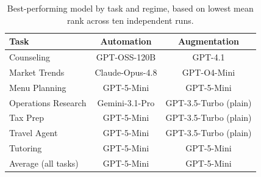 \begin{table}[t]
    \centering
    \caption{Best-performing model by task and regime, based on lowest mean rank across ten independent runs.}
    \label{tab:best-model-by-task}
    \small
    \begin{tabular}{lcc}
        \toprule
        Task & Automation & Augmentation \\
        \midrule
        Counseling & GPT-OSS-120B & GPT-4.1 \\
        Market Trends & Claude-Opus-4.8 & GPT-O4-Mini \\
        Menu Planning & GPT-5-Mini & GPT-5-Mini \\
        Operations Research & Gemini-3.1-Pro & GPT-3.5-Turbo (plain) \\
        Tax Prep & GPT-5-Mini & GPT-3.5-Turbo (plain) \\
        Travel Agent & GPT-5-Mini & GPT-3.5-Turbo (plain) \\
        Tutoring & GPT-5-Mini & GPT-5-Mini \\
        Average (all tasks) & GPT-5-Mini & GPT-5-Mini \\
        \bottomrule
    \end{tabular}
\end{table}
